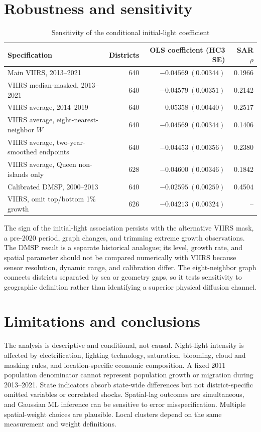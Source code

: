 \documentclass[11pt,a4paper]{article}
\begin{document}
\section{Robustness and sensitivity}
\begin{table}[htbp]
\centering\small
\caption{Sensitivity of the conditional initial-light coefficient}
\begin{tabular}{lrrr}
\toprule
Specification & Districts & OLS coefficient (HC3 SE) & SAR $\rho$\\
\midrule
Main VIIRS, 2013--2021 & 640 & $-0.04569\ (0.00344)$ & 0.1966\\
VIIRS median-masked, 2013--2021 & 640 & $-0.04579\ (0.00351)$ & 0.2142\\
VIIRS average, 2014--2019 & 640 & $-0.05358\ (0.00440)$ & 0.2517\\
VIIRS average, eight-nearest-neighbor $W$ & 640 & $-0.04569\ (0.00344)$ & 0.1406\\
VIIRS average, two-year-smoothed endpoints & 640 & $-0.04453\ (0.00356)$ & 0.2380\\
VIIRS average, Queen non-islands only & 628 & $-0.04600\ (0.00346)$ & 0.1842\\
Calibrated DMSP, 2000--2013 & 640 & $-0.02595\ (0.00259)$ & 0.4504\\
VIIRS, omit top/bottom 1\% growth & 626 & $-0.04213\ (0.00324)$ & --\\
\bottomrule
\end{tabular}
\label{tab:robust}
\end{table}

The sign of the initial-light association persists with the alternative VIIRS mask, a pre-2020 period, graph changes, and trimming extreme growth observations. The DMSP result is a separate historical analogue; its level, growth rate, and spatial parameter should not be compared numerically with VIIRS because sensor resolution, dynamic range, and calibration differ. The eight-neighbor graph connects districts separated by sea or geometry gaps, so it tests sensitivity to geographic definition rather than identifying a superior physical diffusion channel.

\section{Limitations and conclusions}
The analysis is descriptive and conditional, not causal. Night-light intensity is affected by electrification, lighting technology, saturation, blooming, cloud and masking rules, and location-specific economic composition. A fixed 2011 population denominator cannot represent population growth or migration during 2013--2021. State indicators absorb state-wide differences but not district-specific omitted variables or correlated shocks. Spatial-lag outcomes are simultaneous, and Gaussian ML inference can be sensitive to error misspecification. Multiple spatial-weight choices are plausible. Local clusters depend on the same measurement and weight definitions.
\end{document}
